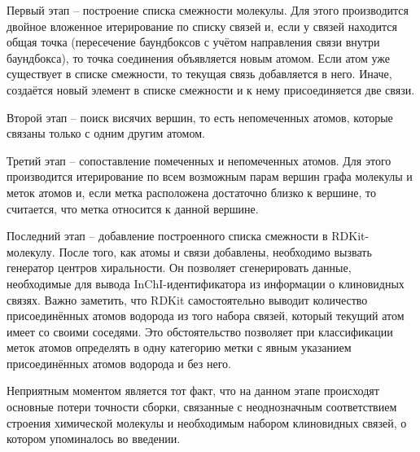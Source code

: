 Первый этап -- построение списка смежности молекулы. Для этого производится двойное вложенное итерирование по списку связей и, если у связей находится общая точка (пересечение баундбоксов с учётом направления связи внутри баундбокса), то точка соединения объявляется новым атомом. Если атом уже существует в списке смежности, то текущая связь добавляется в него. Иначе, создаётся новый элемент в списке смежности и к нему присоединяется две связи.

Второй этап -- поиск висячих вершин, то есть непомеченных атомов, которые связаны только с одним другим атомом.

Третий этап -- сопоставление помеченных и непомеченных атомов. Для этого производится итерирование по всем возможным парам вершин графа молекулы и меток атомов и, если метка расположена достаточно близко к вершине, то считается, что метка относится к данной вершине.

Последний этап -- добавление построенного списка смежности в RDKit-молекулу. После того, как атомы и связи добавлены, необходимо вызвать генератор центров хиральности. Он позволяет сгенерировать данные, необходимые для вывода InChI-идентификатора из информации о клиновидных связях. Важно заметить, что RDKit самостоятельно выводит количество присоединённых атомов водорода из того набора связей, который текущий атом имеет со своими соседями. Это обстоятельство позволяет при классификации меток атомов определять в одну категорию метки с явным указанием присоединённых атомов водорода и без него.

Неприятным моментом является тот факт, что на данном этапе происходят основные потери точности сборки, связанные с неоднозначным соответствием строения химической молекулы и необходимым набором клиновидных связей, о котором упоминалось во введении.

%


